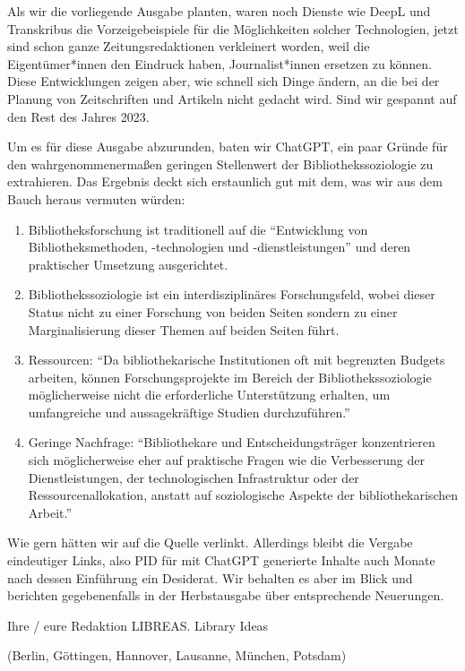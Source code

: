 \documentclass[a4paper,
fontsize=11pt,
oneside,
numbers=noperiodatend,
parskip=half-,
bibliography=totoc,
final
]{scrartcl}
\begin{document}
Als wir die vorliegende Ausgabe planten, waren noch Dienste wie DeepL
und Transkribus die Vorzeigebeispiele für die Möglichkeiten solcher
Technologien, jetzt sind schon ganze Zeitungsredaktionen verkleinert
worden, weil die Eigentümer*innen den Eindruck haben, Journalist*innen
ersetzen zu können. Diese Entwicklungen zeigen aber, wie schnell sich
Dinge ändern, an die bei der Planung von Zeitschriften und Artikeln
nicht gedacht wird. Sind wir gespannt auf den Rest des Jahres 2023.

Um es für diese Ausgabe abzurunden, baten wir ChatGPT, ein paar Gründe
für den wahrgenommenermaßen geringen Stellenwert der
Bibliothekssoziologie zu extrahieren. Das Ergebnis deckt sich
erstaunlich gut mit dem, was wir aus dem Bauch heraus vermuten würden:

\begin{enumerate}
\def\labelenumi{\arabic{enumi}.}
\item
  Bibliotheksforschung ist traditionell auf die \enquote{Entwicklung von
   Bibliotheksmethoden, -technologien und
  -dienstleistungen} und  deren praktischer Umsetzung
  ausgerichtet.
\item
  Bibliothekssoziologie ist ein interdisziplinäres Forschungsfeld,
   wobei dieser Status nicht zu einer Forschung von beiden
  Seiten  sondern zu einer Marginalisierung dieser Themen
  auf beiden Seiten  führt.
\item
  Ressourcen: \enquote{Da bibliothekarische Institutionen oft mit
  begrenzten  Budgets arbeiten, können Forschungsprojekte
  im Bereich der  Bibliothekssoziologie möglicherweise
  nicht die erforderliche  Unterstützung erhalten, um
  umfangreiche und aussagekräftige  Studien
  durchzuführen.}
\item
  Geringe Nachfrage: \enquote{Bibliothekare und Entscheidungsträger
   konzentrieren sich möglicherweise eher auf praktische
  Fragen wie  die Verbesserung der Dienstleistungen, der
  technologischen  Infrastruktur oder der
  Ressourcenallokation, anstatt auf  soziologische Aspekte
  der bibliothekarischen Arbeit.}
\end{enumerate}

Wie gern hätten wir auf die Quelle verlinkt. Allerdings bleibt die
Vergabe eindeutiger Links, also PID für mit ChatGPT generierte Inhalte
auch Monate nach dessen Einführung ein Desiderat. Wir behalten es aber
im Blick und berichten gegebenenfalls in der Herbstausgabe über
entsprechende Neuerungen.

Ihre / eure Redaktion LIBREAS. Library Ideas

(Berlin, Göttingen, Hannover, Lausanne, München, Potsdam)

\end{document}
